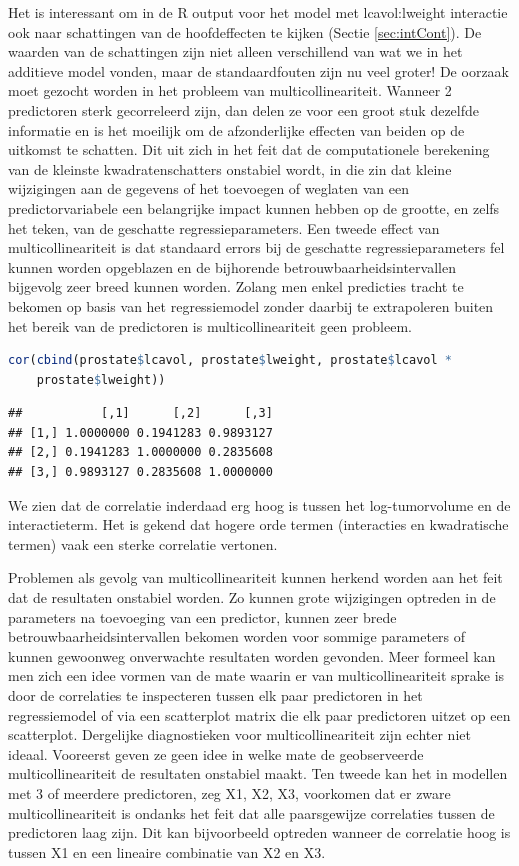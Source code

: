 \documentclass[
  12pt,dutch,coursenotes]{book}
\begin{document}
Het is interessant om in de R output voor het model met lcavol:lweight interactie ook naar schattingen van de hoofdeffecten te kijken (Sectie \ref{sec:intCont}).
De waarden van de schattingen zijn niet alleen verschillend van wat we in het additieve model vonden, maar de standaardfouten zijn nu veel groter!
De oorzaak moet gezocht worden in het probleem van multicollineariteit.
Wanneer 2 predictoren sterk gecorreleerd zijn, dan delen ze voor een groot stuk dezelfde informatie en is het moeilijk om de afzonderlijke effecten van beiden op de uitkomst te schatten. Dit uit zich in het feit dat de computationele berekening van de kleinste kwadratenschatters onstabiel wordt, in die zin dat kleine wijzigingen aan de gegevens of het toevoegen of weglaten van een predictorvariabele een belangrijke impact kunnen hebben op de grootte, en zelfs het teken, van de geschatte regressieparameters.
Een tweede effect van multicollineariteit is dat standaard errors bij de geschatte regressieparameters fel kunnen worden opgeblazen en de bijhorende betrouwbaarheidsintervallen bijgevolg zeer breed kunnen worden. Zolang men enkel predicties tracht te bekomen op basis van het regressiemodel zonder daarbij te extrapoleren buiten het bereik van de predictoren is multicollineariteit geen probleem.

\begin{lstlisting}[language=R]
cor(cbind(prostate$lcavol, prostate$lweight, prostate$lcavol *
    prostate$lweight))
\end{lstlisting}

\begin{lstlisting}
##           [,1]      [,2]      [,3]
## [1,] 1.0000000 0.1941283 0.9893127
## [2,] 0.1941283 1.0000000 0.2835608
## [3,] 0.9893127 0.2835608 1.0000000
\end{lstlisting}

We zien dat de correlatie inderdaad erg hoog is tussen het log-tumorvolume en de interactieterm.
Het is gekend dat hogere orde termen (interacties en kwadratische termen) vaak een sterke correlatie vertonen.

Problemen als gevolg van multicollineariteit kunnen herkend worden aan het feit dat de resultaten onstabiel worden. Zo kunnen grote wijzigingen optreden in de parameters na toevoeging van een predictor, kunnen zeer brede betrouwbaarheidsintervallen bekomen worden voor sommige parameters of kunnen gewoonweg onverwachte resultaten worden gevonden. Meer formeel kan men zich een idee vormen van de mate waarin er van multicollineariteit sprake is door de correlaties te inspecteren tussen elk paar predictoren in het regressiemodel of via een scatterplot matrix die elk paar predictoren uitzet op een scatterplot.
Dergelijke diagnostieken voor multicollineariteit zijn echter niet ideaal.
Vooreerst geven ze geen idee in welke mate de geobserveerde multicollineariteit de resultaten onstabiel maakt.
Ten tweede kan het in modellen met 3 of meerdere predictoren, zeg X1, X2, X3, voorkomen dat er zware multicollineariteit is ondanks het feit dat alle paarsgewijze correlaties tussen de predictoren laag zijn.
Dit kan bijvoorbeeld optreden wanneer de correlatie hoog is tussen X1 en een lineaire combinatie van X2 en X3.
\end{document}
